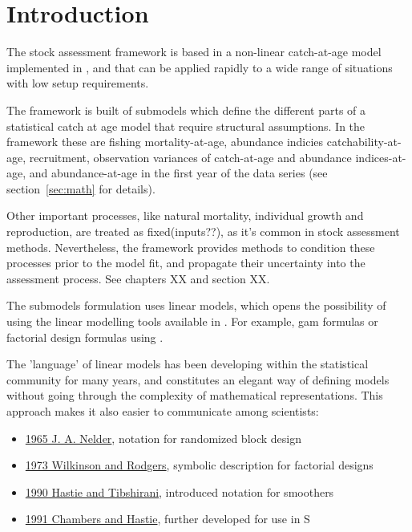 \documentclass[a4paper,english,11pt]{article}
\begin{document}
\section{Introduction}

The \aFa stock assessment framework is based in a non-linear catch-at-age model implemented in \R, \FLR and \ADMB that can be applied rapidly to a wide range of situations with low setup requirements.

The framework is built of submodels which define the different parts of a statistical catch at age model that require structural assumptions. In the \aFa framework these are fishing mortality-at-age, abundance indicies catchability-at-age, recruitment, observation variances of catch-at-age and abundance indices-at-age, and abundance-at-age in the first year of the data series (see section~\ref{sec:math} for details).

Other important processes, like natural mortality, individual growth and reproduction, are treated as fixed(inputs??), as it's common in stock assessment methods. Nevertheless, the \aFa framework provides methods to condition these processes prior to the model fit, and propagate their uncertainty into the assessment process. See chapters XX and section XX.

The submodels formulation uses linear models, which opens the possibility of using the linear modelling tools available in \R. For example, \href{http://cran.r-project.org/web/packages/mgcv/index.html}{} gam formulas or factorial design formulas using .

The 'language' of linear models has been developing within the statistical community for many years, and constitutes an elegant way of defining models without going through the complexity of mathematical representations. This approach makes it also easier to communicate among scientists:
\begin{itemize}
  \item \href{http://rspa.royalsocietypublishing.org/content/283/1393/147.short}{1965 J. A. Nelder}, notation for randomized block design
  \item \href{http://www.jstor.org/stable/info/2346786}{1973 Wilkinson and Rodgers}, symbolic description for factorial designs
  \item \href{http://books.google.com/books?isbn=0412343908}{1990 Hastie and Tibshirani}, introduced notation for smoothers
  \item \href{http://books.google.com/books?isbn=041283040X}{1991 Chambers and Hastie}, further developed for use in S
\end{itemize}
\end{document}
